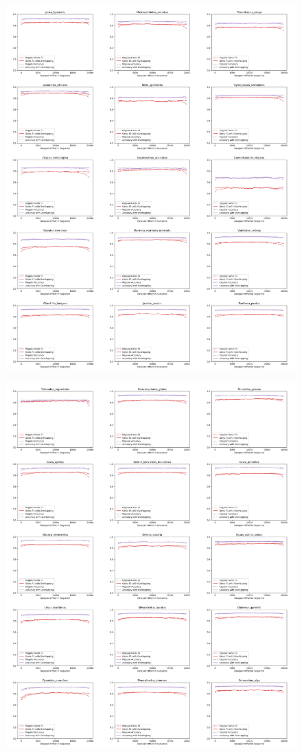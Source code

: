 \documentclass{article}
\begin{document}
\begin{figure}[!h]
\centerline{\includegraphics[width=1.2\textwidth]{images/overlapping/montage_animals5}}
\end{figure}
\begin{figure}[!h]
\centerline{\includegraphics[width=1.2\textwidth]{images/overlapping/montage_animals6}}
\end{figure}
\end{document}
